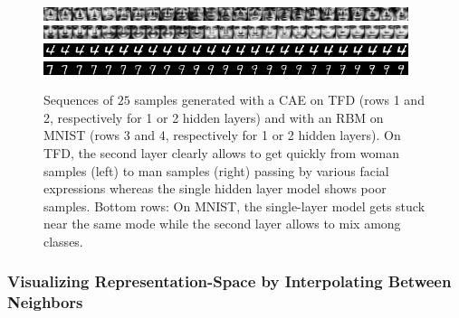 \begin{figure}
\vspace*{-3mm}
\begin{center}
    \includegraphics[width=0.95\textwidth]{article3/images/cae1tfd_seq4_data_image_noncen.png}
    \includegraphics[width=0.95\textwidth]{article3/images/cae2tfd_seq6_data_image_noncen.png}
    \includegraphics[width=0.95\textwidth]{article3/images/rbm1mnist_seq3_data_image_noncen.png}
    \includegraphics[width=0.95\textwidth]{article3/images/rbm2mnist_seq17_data_image_noncen.png}
\end{center}
\vspace*{-3mm}
\caption[Sequences of Samples]{Sequences of $25$ samples generated with a CAE
on TFD (rows 1 and 2, respectively for 1 or 2 hidden layers) 
and with an RBM on MNIST (rows 3 and 4, respectively for 1 or
2 hidden layers). 
{\small On TFD, the second layer clearly allows to get
quickly from woman samples (left) to man samples (right) passing by various facial
expressions whereas the single hidden layer model shows poor samples.
Bottom rows: On MNIST, the single-layer model gets stuck
near the same mode while the second layer allows to mix among classes.}  }

\label{fig:seq}
\vspace*{-3mm}
\end{figure}


\vspace*{-1mm}
\subsubsection{Visualizing Representation-Space by Interpolating Between Neighbors}
\vspace*{-1mm}

